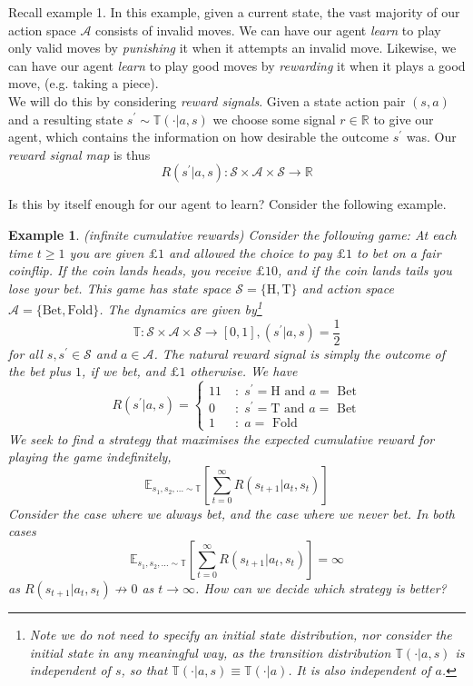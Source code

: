 \documentclass[12pt]{article}
\newtheorem{example}{Example}
\begin{document}
Recall example 1. In this example, given a current state, the vast majority of our action space $\mathcal{A}$ consists of invalid 
moves. We can have our agent \textit{learn} to play only valid moves by \textit{punishing} it when it attempts an invalid move. 
Likewise, we can have our agent \textit{learn} to play good moves by \textit{rewarding} it when it plays a good move, (e.g. 
taking a piece). \\

We will do this by considering \textit{reward signals}. Given a state action pair $(s, a)$ and a resulting state $s^\prime \sim 
\mathbb{T}(\cdot | a, s)$ we choose some signal $r \in \mathbb{R}$ to give our agent, which contains the information on how 
desirable the outcome $s^\prime$ was. Our \textit{reward signal map} is thus
$$
R(s^\prime | a, s): \mathcal{S} \times \mathcal{A} \times \mathcal{S} \to \mathbb{R}
$$

Is this by itself enough for our agent to learn? Consider the following example. 

\begin{example}{(infinite cumulative rewards)}
Consider the following game: At each time $t \geq 1$ you are given $\pounds 1$ and allowed the choice to pay $\pounds 1$ to bet 
on a fair coinflip. If the coin lands heads, you receive $\pounds 10$, and if the coin lands tails you lose your bet. This game has 
state space $\mathcal{S} = \{\text{H}, \text{T}\}$ and action space $\mathcal{A} = \{\text{Bet}, \text{Fold}\}$. The dynamics are given 
by\footnote{
    Note we do not need to specify an initial state distribution, nor consider the initial state in any meaningful way, 
    as the transition distribution $\mathbb{T}(\cdot | a, s)$ is independent of $s$, so that $\mathbb{T}(\cdot | a, s) \equiv 
    \mathbb{T}(\cdot | a)$. It is also independent of $a$.
}
$$
\mathbb{T}: \mathcal{S} \times \mathcal{A} \times \mathcal{S} \to [0,1], (s^\prime | a, s) = \frac{1}{2}
$$
for all $s, s^\prime \in \mathcal{S}$ and $a \in \mathcal{A}$. The natural reward signal is simply the outcome of the bet plus 
$1$, if we bet, and $\pounds 1$ otherwise. We have 
$$
R(s^\prime | a, s) = \begin{cases} 
        11 \; &: \; s^\prime = \text{H} \text{ and } a = \text{ Bet} \\ 
        0 \; &: \; s^\prime = \text{T} \text{ and } a = \text{ Bet} \\ 
        1 \; &: \; a = \text{ Fold} 
\end{cases}
$$
We seek to find a strategy that maximises the expected cumulative reward for playing the game indefinitely, 
$$
\mathbb{E}_{s_1, s_2, \dots \sim \mathbb{T}}\left[\sum_{t = 0}^\infty R(s_{t+1} | a_t, s_t)\right]
$$
Consider the case where we always bet, and the case where we never bet. In both cases
$$
\mathbb{E}_{s_1, s_2, \dots \sim \mathbb{T}}\left[\sum_{t = 0}^\infty R(s_{t+1} | a_t, s_t)\right] = \infty
$$
as $R(s_{t+1} | a_t, s_t) \not\to 0$ as $t \to \infty$. How can we decide which strategy is better?
\end{example}
\end{document}
